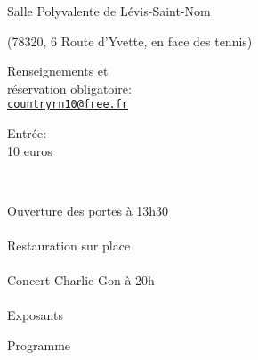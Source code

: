 \documentclass[12pt,a4paper]{article}
\begin{document}



\vspace*{15mm}

\fontsize{20pt}{20pt}\selectfont

Salle Polyvalente de Lévis-Saint-Nom

{\fontsize{14pt}{16pt}\selectfont
(78320, 6 Route d'Yvette, en face des tennis)}

\vspace*{5mm}

Renseignements et \\
réservation obligatoire: \\
\href{mailto:countryrn10@free.fr}{\texttt{countryrn10@free.fr}}

\vspace*{5mm}

Entrée: \\
10 euros

\vspace*{-30mm}
\vfill

~\hfill\begin{minipage}{0.35\linewidth}
  \begin{center}
    Ouverture des portes
    à 13h30\\
    ~\\
    Restauration
    sur place\\
    ~\\
    Concert Charlie Gon à 20h\\
    ~\\
    Exposants
\end{center}
\end{minipage}


\newpage

\begin{center}
Programme
\end{center}
\end{document}
